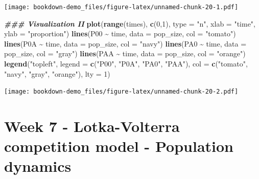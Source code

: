 \documentclass[
]{book}
\newenvironment{Shaded}{\begin{snugshade}}{\end{snugshade}}
\newcommand{\AttributeTok}[1]{\textcolor[rgb]{0.13,0.29,0.53}{#1}}
\newcommand{\DecValTok}[1]{\textcolor[rgb]{0.00,0.00,0.81}{#1}}
\newcommand{\DocumentationTok}[1]{\textcolor[rgb]{0.56,0.35,0.01}{\textbf{\textit{#1}}}}
\newcommand{\FunctionTok}[1]{\textcolor[rgb]{0.13,0.29,0.53}{\textbf{#1}}}
\newcommand{\NormalTok}[1]{#1}
\newcommand{\SpecialCharTok}[1]{\textcolor[rgb]{0.81,0.36,0.00}{\textbf{#1}}}
\newcommand{\StringTok}[1]{\textcolor[rgb]{0.31,0.60,0.02}{#1}}
\begin{document}
\texttt{[image: bookdown-demo\_files/figure-latex/unnamed-chunk-20-1.pdf]}

\begin{Shaded}
\begin{Highlighting}[]
\DocumentationTok{\#\#\# Visualization II}
\FunctionTok{plot}\NormalTok{(}\FunctionTok{range}\NormalTok{(times), }\FunctionTok{c}\NormalTok{(}\DecValTok{0}\NormalTok{,}\DecValTok{1}\NormalTok{), }\AttributeTok{type =} \StringTok{"n"}\NormalTok{, }\AttributeTok{xlab =} \StringTok{"time"}\NormalTok{, }\AttributeTok{ylab =} \StringTok{"proportion"}\NormalTok{)}
\FunctionTok{lines}\NormalTok{(P00 }\SpecialCharTok{\textasciitilde{}}\NormalTok{ time, }\AttributeTok{data =}\NormalTok{ pop\_size, }\AttributeTok{col =} \StringTok{"tomato"}\NormalTok{)}
\FunctionTok{lines}\NormalTok{(P0A }\SpecialCharTok{\textasciitilde{}}\NormalTok{ time, }\AttributeTok{data =}\NormalTok{ pop\_size, }\AttributeTok{col =} \StringTok{"navy"}\NormalTok{)}
\FunctionTok{lines}\NormalTok{(PA0 }\SpecialCharTok{\textasciitilde{}}\NormalTok{ time, }\AttributeTok{data =}\NormalTok{ pop\_size, }\AttributeTok{col =} \StringTok{"gray"}\NormalTok{)}
\FunctionTok{lines}\NormalTok{(PAA }\SpecialCharTok{\textasciitilde{}}\NormalTok{ time, }\AttributeTok{data =}\NormalTok{ pop\_size, }\AttributeTok{col =} \StringTok{"orange"}\NormalTok{)}
\FunctionTok{legend}\NormalTok{(}\StringTok{"topleft"}\NormalTok{, }\AttributeTok{legend =} \FunctionTok{c}\NormalTok{(}\StringTok{"P00"}\NormalTok{, }\StringTok{"P0A"}\NormalTok{, }\StringTok{"PA0"}\NormalTok{, }\StringTok{"PAA"}\NormalTok{), }\AttributeTok{col =} \FunctionTok{c}\NormalTok{(}\StringTok{"tomato"}\NormalTok{, }\StringTok{"navy"}\NormalTok{, }\StringTok{"gray"}\NormalTok{, }\StringTok{"orange"}\NormalTok{), }\AttributeTok{lty =} \DecValTok{1}\NormalTok{)}
\end{Highlighting}
\end{Shaded}

\texttt{[image: bookdown-demo\_files/figure-latex/unnamed-chunk-20-2.pdf]}

\hypertarget{week-7---lotka-volterra-competition-model---population-dynamics}{%
\chapter*{Week 7 - Lotka-Volterra competition model - Population dynamics}\label{week-7---lotka-volterra-competition-model---population-dynamics}}
\end{document}
